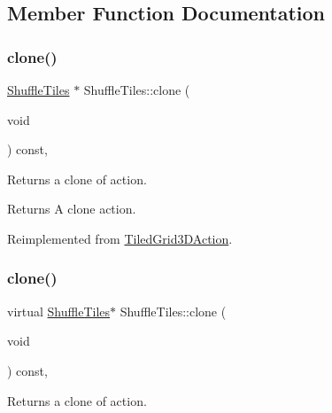 \subsection{Member Function Documentation}
\mbox{\label{classShuffleTiles_aedd65e1a5cad0797a3d7cf30366e7de8}} 
\subsubsection{\texorpdfstring{clone()}{clone()}\hspace{0.1cm}{\footnotesize\ttfamily [1/2]}}
{\footnotesize\ttfamily \hyperlink{classShuffleTiles}{Shuffle\+Tiles} $\ast$ Shuffle\+Tiles\+::clone (\begin{DoxyParamCaption}\item[{void}]{ }\end{DoxyParamCaption}) const\hspace{0.3cm}{\ttfamily [override]}, {\ttfamily [virtual]}}

Returns a clone of action.

\begin{DoxyReturn}{Returns}
A clone action. 
\end{DoxyReturn}


Reimplemented from \hyperlink{classTiledGrid3DAction_a689fd377cc0abae91db7def106529b53}{Tiled\+Grid3\+D\+Action}.

\mbox{\label{classShuffleTiles_a77da891a86963aa76948363caa58dd52}} 
\subsubsection{\texorpdfstring{clone()}{clone()}\hspace{0.1cm}{\footnotesize\ttfamily [2/2]}}
{\footnotesize\ttfamily virtual \hyperlink{classShuffleTiles}{Shuffle\+Tiles}$\ast$ Shuffle\+Tiles\+::clone (\begin{DoxyParamCaption}\item[{void}]{ }\end{DoxyParamCaption}) const\hspace{0.3cm}{\ttfamily [override]}, {\ttfamily [virtual]}}

Returns a clone of action.

